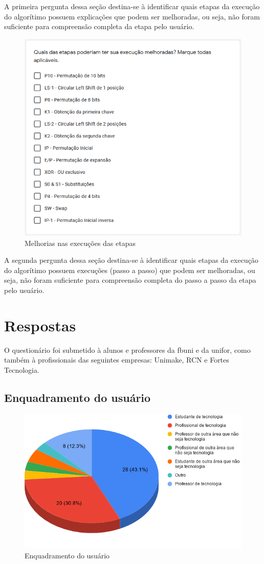 A primeira pergunta dessa seção destina-se à identificar quais etapas da execução do algorítimo possuem explicações que podem ser melhoradas, ou seja, não foram suficiente para compreensão completa da etapa pelo usuário.

\begin{figure}[H]
    \centering
    \caption{Melhorias nas execuções das etapas}
    \includegraphics[width=0.7\linewidth]{Questionario/Q6.png}
\end{figure}

A segunda pergunta dessa seção destina-se à identificar quais etapas da execução do algorítimo possuem execuções (passo a passo) que podem ser melhoradas, ou seja, não foram suficiente para compreensão completa do passo a passo da etapa pelo usuário.

\section{Respostas}

O questionário foi submetido à alunos e professores da \acrshort{fbuni} e da \acrshort{unifor}, como também à profissionais das seguintes empresas: Unimake, RCN e Fortes Tecnologia.

\subsection{Enquadramento do usuário}

\begin{figure}[H]
    \centering
    \caption{Enquadramento do usuário}
    \includegraphics[width=.65\linewidth]{Questionario/CQ1.png}
\end{figure}


